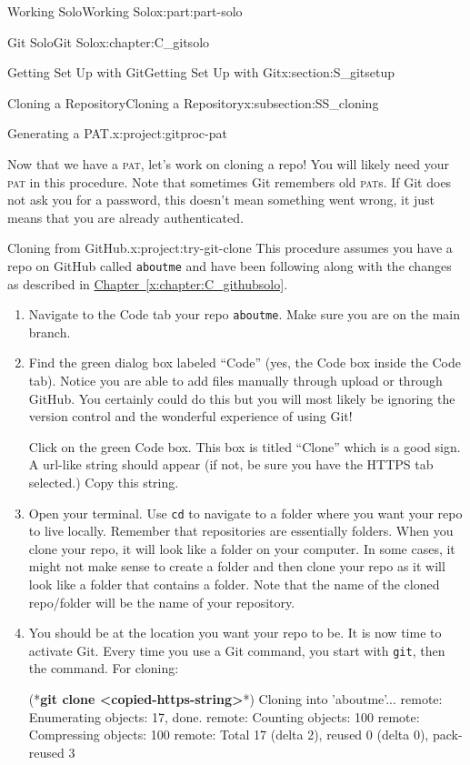 \documentclass[oneside,10pt,]{book}
\newcommand{\xreffont}{\relax}
\newcommand{\mono}[1]{\texttt{#1}}
\newcommand{\acronym}[1]{\textsc{\MakeLowercase{#1}}}
\DeclareRobustCommand{\acronymintitle}[1]{\texorpdfstring{#1}{#1}}
\newcommand{\consoleinput}[1]{\textbf{#1}}
\begin{document}
\begin{partptx}{Working Solo}{}{Working Solo}{}{}{x:part:part-solo}
\begin{chapterptx}{Git Solo}{}{Git Solo}{}{}{x:chapter:C_gitsolo}
\begin{sectionptx}{Getting Set Up with Git}{}{Getting Set Up with Git}{}{}{x:section:S_gitsetup}
\begin{subsectionptx}{Cloning a Repository}{}{Cloning a Repository}{}{}{x:subsection:SS_cloning}
\begin{project}{Generating a \acronymintitle{PAT}.}{x:project:gitproc-pat}
\begin{enumerate}[font=\bfseries,label=(\alph*),ref=\alph*]
\end{enumerate}
\end{project}%
Now that we have a \acronym{PAT}, let's work on cloning a repo! You will likely need your \acronym{PAT} in this procedure. Note that sometimes Git remembers old \acronym{PAT}s. If Git does not ask you for a password, this doesn't mean something went wrong, it just means that you are already authenticated.%
\begin{project}{Cloning from GitHub.}{x:project:try-git-clone}%
%
This procedure assumes you have a repo on GitHub called \mono{aboutme} and have been following along with the changes as described in \hyperref[x:chapter:C_githubsolo]{Chapter~{\xreffont\ref{x:chapter:C_githubsolo}}}.%
\begin{enumerate}[font=\bfseries,label=(\alph*),ref=\alph*]
\item{}Navigate to the Code tab your repo \mono{aboutme}. Make sure you are on the main branch.%
\item\label{x:task:clone-https}Find the green dialog box labeled ``Code'' (yes, the Code box inside the Code tab). Notice you are able to add files manually through upload or through GitHub. You certainly could do this but you will most likely be ignoring the version control and the wonderful experience of using Git!%
\par
Click on the green Code box. This box is titled ``Clone'' which is a good sign. A url-like string should appear (if not, be sure you have the HTTPS tab selected.) Copy this string.%
\item{}Open your terminal. Use \mono{cd} to navigate to a folder where you want your repo to live locally. Remember that repositories are essentially folders. When you clone your repo, it will look like a folder on your computer. In some cases, it might not make sense to create a folder and then clone your repo as it will look like a folder that contains a folder. Note that the name of the cloned repo\slash{}folder will be the name of your repository.%
\item{}You should be at the location you want your repo to be. It is now time to activate Git. Every time you use a Git command, you start with \mono{git}, then the command. For cloning:%
\begin{console}{0}{1}{0}
(*\consoleinput{git clone <copied-https-string>}*)
Cloning into 'aboutme'...
remote: Enumerating objects: 17, done.
remote: Counting objects: 100%
remote: Compressing objects: 100%
remote: Total 17 (delta 2), reused 0 (delta 0), pack-reused 3

\end{console}
\end{enumerate}
\end{project}
\end{subsectionptx}
\end{sectionptx}
\end{chapterptx}
\end{partptx}
\end{document}
